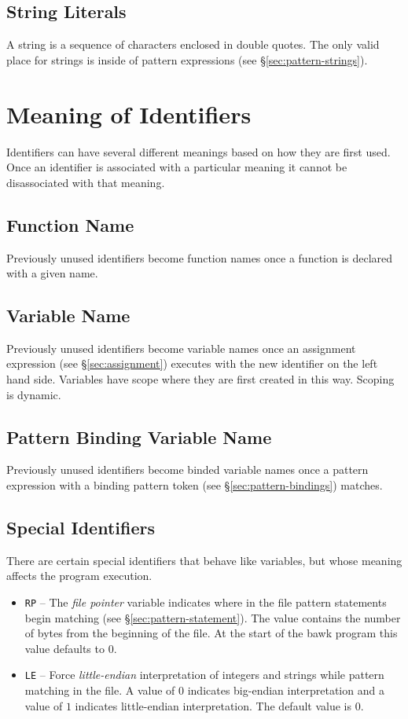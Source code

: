 \subsection{String Literals}
\label{sec:strings}
A string is a sequence of characters enclosed in double quotes.  The only valid place for strings is inside of pattern expressions (see \S\ref{sec:pattern-strings}).

\section{Meaning of Identifiers}
Identifiers can have several different meanings based on how they are first used.  Once an identifier is associated with a particular meaning it cannot be disassociated with that meaning.

\subsection{Function Name}
Previously unused identifiers become function names once a function is declared with a given name.

\subsection{Variable Name}
\label{sec:variables}
Previously unused identifiers become variable names once an assignment expression (see \S\ref{sec:assignment}) executes with the new identifier on the left hand side.  Variables have scope where they are first created in this way.  Scoping is dynamic.

\subsection{Pattern Binding Variable Name}
\label{sec:bind-variables}
Previously unused identifiers become binded variable names once a pattern expression with a binding pattern token (see \S\ref{sec:pattern-bindings}) matches.

\subsection{Special Identifiers}
\label{sec:special-identifiers}
There are certain special identifiers that behave like variables, but whose meaning affects the program execution.
\begin{itemize}
\item \texttt{RP} -- The \textsl{file pointer} variable  indicates where in the file pattern statements begin matching (see \S\ref{sec:pattern-statement}).  The value contains the number of bytes from the beginning of the file.  At the start of the bawk program this value defaults to $0$.
\item \texttt{LE} -- Force \textsl{little-endian} interpretation of integers and strings while pattern matching in the file.  A value of $0$ indicates big-endian interpretation and a value of $1$ indicates little-endian interpretation.  The default value is $0$.
\end{itemize}


